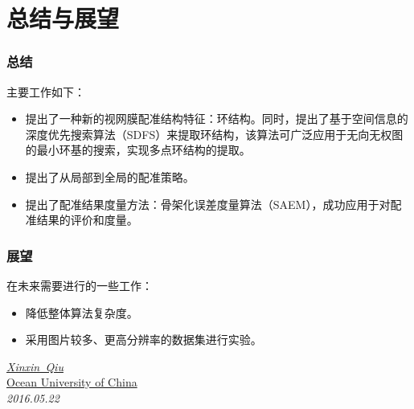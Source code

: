 \documentclass[notheorems,mathserif,table,compress]{beamer}  %
\begin{document}
\section{总结与展望}
\begin{frame}
\frametitle{总结}
主要工作如下：
\begin{itemize}
\item 提出了一种新的视网膜配准结构特征：环结构。同时，提出了基于空间信息的深度优先搜索算法（SDFS）来提取环结构，该算法可广泛应用于无向无权图的最小环基的搜索，实现多点环结构的提取。
\item 提出了从局部到全局的配准策略。
\item 提出了配准结果度量方法：骨架化误差度量算法（SAEM），成功应用于对配准结果的评价和度量。
\end{itemize}
\end{frame}

\begin{frame}
\frametitle{展望}
在未来需要进行的一些工作：
\begin{itemize}
\item 降低整体算法复杂度。
\item 采用图片较多、更高分辨率的数据集进行实验。
\end{itemize}
\end{frame}

\begin{frame}
\vspace{2cm}

\vspace{1.5cm}

\begin{flushright}
\emph{\href{mailto:qxx1990421@163.com}{\textrm {Xinxin~Qiu}}}\\
\href{http://www.ouc.edu.cn}{\textrm {Ocean University of China}}\\
\emph{\textrm {2016.05.22}}
\end{flushright}  
\end{frame}
\end{document}
